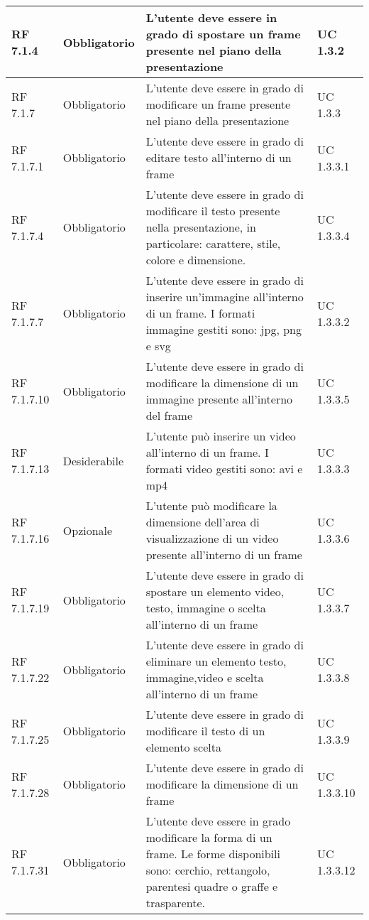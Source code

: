 {\begin{longtable} [c]{| p{2.5cm} | p{2.5cm} | p{6cm} |p{2.5cm}|}
		\hline
		RF 7.1.4 & Obbligatorio & L'utente deve essere in grado di spostare un frame\ped{g} presente nel piano della presentazione\ped{g} & UC 1.3.2\\
		\hline
		RF 7.1.7 & Obbligatorio & L'utente deve essere in grado di modificare un frame\ped{g} presente nel piano della presentazione\ped{g} & UC 1.3.3\\
		\hline
		RF 7.1.7.1 & Obbligatorio & L'utente deve essere in grado di editare testo all'interno di un frame\ped{g} & UC 1.3.3.1\\
		\hline
		RF 7.1.7.4 & Obbligatorio & L'utente deve essere in grado di modificare il testo presente nella presentazione, in particolare: carattere, stile, colore e dimensione. & UC 1.3.3.4\\
		\hline
		RF 7.1.7.7 & Obbligatorio & L'utente deve essere in grado di inserire un'immagine all'interno di un frame\ped{g}. I formati immagine gestiti sono: jpg, png e svg & UC 1.3.3.2\\
		\hline
		RF 7.1.7.10 & Obbligatorio & L'utente deve essere in grado di modificare la dimensione di un immagine presente all'interno del frame\ped{g} & UC 1.3.3.5\\
		\hline
		RF 7.1.7.13 & Desiderabile & L'utente può inserire un video all'interno di un frame\ped{g}. I formati video gestiti sono: avi e mp4 & UC 1.3.3.3\\
		\hline
		RF 7.1.7.16 & Opzionale & L'utente può modificare la dimensione dell’area di visualizzazione di un video presente all'interno di un frame\ped{g}  & UC 1.3.3.6\\
		\hline
		RF 7.1.7.19 & Obbligatorio & L'utente deve essere in grado di spostare un elemento video, testo, immagine o scelta all'interno di un frame\ped{g} & UC 1.3.3.7\\
		\hline
		RF 7.1.7.22 & Obbligatorio & L'utente deve essere in grado di eliminare un elemento testo, immagine,video e scelta all'interno di un frame\ped{g} & UC 1.3.3.8\\
		\hline
		RF 7.1.7.25 & Obbligatorio & L'utente deve essere in grado di modificare il testo di un elemento scelta\ped{g} & UC 1.3.3.9\\
		\hline
		RF 7.1.7.28 & Obbligatorio & L'utente deve essere in grado di modificare la dimensione di un frame\ped{g} & UC 1.3.3.10\\
		\hline
		RF 7.1.7.31 & Obbligatorio & L'utente deve essere in grado modificare la forma di un frame\ped{g}. Le forme disponibili sono: cerchio, rettangolo, parentesi quadre o graffe e trasparente. & UC 1.3.3.12\\

\end{longtable}}
